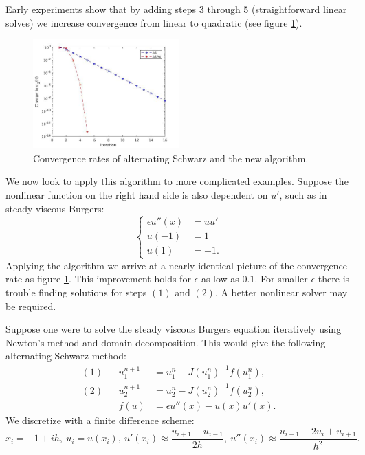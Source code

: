 \documentclass{book}
\begin{document}
Early experiments show that by adding steps 3 through 5 (straightforward linear solves) we increase convergence from linear to quadratic (see figure \ref{fig:ASPN01}).

\begin{figure}
\centering
	\includegraphics[width=0.5\textwidth]{ASPN01.jpg}
	\caption{Convergence rates of alternating Schwarz and the new algorithm.}
	\label{fig:ASPN01}
\end{figure}

We now look to apply this algorithm to more complicated examples.
Suppose the nonlinear function on the right hand side is also dependent on $u'$, such as in steady viscous Burgers:
\begin{equation*}
\begin{cases} \epsilon u''(x) & = u u' \\
u(-1) & = 1 \\
u(1) & = -1 . \end{cases}
\end{equation*}
Applying the algorithm we arrive at a nearly identical picture of the convergence rate as figure \ref{fig:ASPN01}.
This improvement holds for $\epsilon$ as low as $0.1$.
For smaller $\epsilon$ there is trouble finding solutions for steps $(1)$ and $(2)$.
A better nonlinear solver may be required.

Suppose one were to solve the steady viscous Burgers equation iteratively using Newton's method and domain decomposition.
This would give the following alternating Schwarz method:
\begin{align*}
(1) && u^{n+1}_1 & = u^n_1 - J(u^n_1)^{-1} f(u^n_1) , \\
(2) && u^{n+1}_2 & = u^n_2 - J(u^n_2)^{-1} f(u^n_2) , \\
&& f(u) & = \epsilon u''(x) - u(x) u'(x) .
\end{align*}
We discretize with a finite difference scheme:
\begin{equation*}
x_i = -1 + ih, \ u_i = u(x_i), \ u'(x_i) \approx \frac{u_{i+1} - u_{i-1}}{2h}, \ u''(x_i) \approx \frac{u_{i-1} - 2u_i + u_{i+1}}{h^2} .
\end{equation*}
\end{document}
